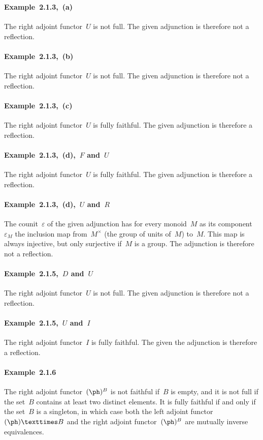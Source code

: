 \subsubsection{}

\paragraph{Example~2.1.3,~(a)}
The right adjoint functor~$U$ is not full.
The given adjunction is therefore not a reflection.

\paragraph{Example~2.1.3,~(b)}
The right adjoint functor~$U$ is not full.
The given adjunction is therefore not a reflection.

\paragraph{Example~2.1.3,~(c)}
The right adjoint functor~$U$ is fully faithful.
The given adjunction is therefore a reflection.

\paragraph{Example~2.1.3,~(d),~$F$ and~$U$}
The right adjoint functor~$U$ is fully faithful.
The given adjunction is therefore a reflection.

\paragraph{Example~2.1.3,~(d),~$U$ and~$R$}
The counit~$ε$ of the given adjunction has for every monoid~$M$ as its component~$ε_M$ the inclusion map from~$M^×$ (the group of units of~$M$) to~$M$.
This map is always injective, but only surjective if~$M$ is a group.
The adjunction is therefore not a reflection.

\paragraph{Example~2.1.5,~$D$ and~$U$}
The right adjoint functor~$U$ is not full.
The given adjunction is therefore not a reflection.

\paragraph{Example~2.1.5,~$U$ and~$I$}
The right adjoint functor~$I$ is fully faithful.
The given the adjunction is therefore a reflection.

\paragraph{Example~2.1.6}
The right adjoint functor~$(\ph)^B$ is not faithful if~$B$ is empty, and it is not full if the set~$B$ contains at least two distinct elements.
It is fully faithful if and only if the set~$B$ is a singleton, in which case both the left adjoint functor~$(\ph) × B$ and the right adjoint functor~$(\ph)^B$ are mutually inverse equivalences.
